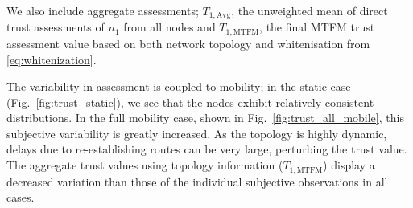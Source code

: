 \documentclass[conference]{IEEEtran}
\begin{document}
We also include aggregate assessments; $T_{1,\text{Avg}}$, the unweighted mean of direct trust assessments of $n_1$ from all nodes and $T_{1,\text{MTFM}}$, the final MTFM trust assessment value based on both network topology and whitenisation from \eqref{eq:whitenization}.

The variability in assessment is coupled to mobility; in the static case (Fig.~\ref{fig:trust_static}), we see that the nodes exhibit relatively consistent distributions.
In the full mobility case, shown in Fig.~\ref{fig:trust_all_mobile}, this subjective variability is greatly increased. 
As the topology is highly dynamic, delays due to re-establishing routes can be very large, perturbing the trust value.
The aggregate trust values using topology information ($T_{1,\text{MTFM}}$) display a decreased variation than those of the individual subjective observations in all cases.
\end{document}
